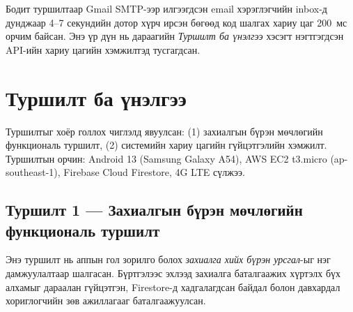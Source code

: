 Бодит туршилтаар Gmail SMTP-ээр илгээгдсэн email хэрэглэгчийн inbox-д дунджаар 4--7 секундийн дотор хүрч ирсэн бөгөөд код шалгах хариу цаг 200~мс орчим байсан. Энэ үр дүн нь дараагийн \textit{Туршилт ба үнэлгээ} хэсэгт нэгтгэгдсэн API-ийн хариу цагийн хэмжилтэд тусгагдсан.


\section{Туршилт ба үнэлгээ}

Туршилтыг хоёр голлох чиглэлд явуулсан: (1) захиалгын бүрэн мөчлөгийн функциональ туршилт, (2) системийн хариу цагийн гүйцэтгэлийн хэмжилт. Туршилтын орчин: Android 13 (Samsung Galaxy A54), AWS EC2 t3.micro (ap-southeast-1), Firebase Cloud Firestore, 4G LTE сүлжээ.

\subsection*{Туршилт 1 — Захиалгын бүрэн мөчлөгийн функциональ туршилт}

Энэ туршилт нь аппын гол зорилго болох \textit{захиалга хийх бүрэн урсгал}-ыг нэг дамжуулалтаар шалгасан. Бүртгэлээс эхлээд захиалга баталгаажих хүртэлх бүх алхамыг дараалан гүйцэтгэн, Firestore-д хадгалагдсан байдал болон давхардал хориглогчийн зөв ажиллагааг баталгаажуулсан.

